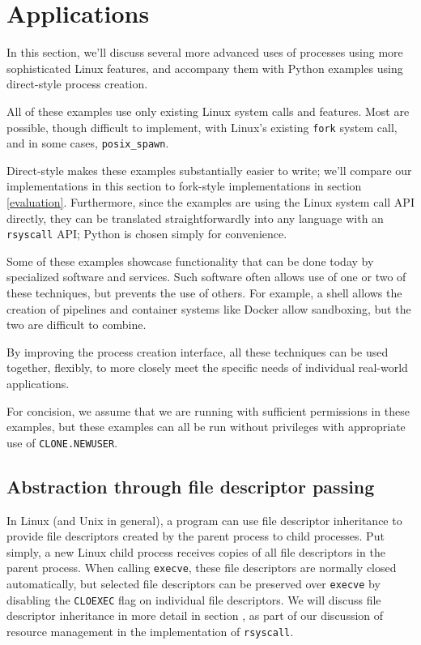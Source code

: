 \documentclass[sigplan]{acmart}
\begin{document}
\section{Applications}\label{applications}
In this section,
we'll discuss several more advanced uses of processes
using more sophisticated Linux features,
and accompany them with Python examples using direct-style process creation.

All of these examples use only existing Linux system calls and features.
Most are possible, though difficult to implement,
with Linux's existing \texttt{fork} system call,
and in some cases, \verb|posix_spawn|.

Direct-style makes these examples substantially easier to write;
we'll compare our implementations in this section to fork-style implementations in section \ref{evaluation}.
Furthermore, since the examples are using the Linux system call API directly,
they can be translated straightforwardly into any language with an \texttt{rsyscall} API;
Python is chosen simply for convenience.

Some of these examples showcase functionality that can be done today by specialized software and services.
Such software often allows use of one or two of these techniques, but prevents the use of others.
For example, a shell allows the creation of pipelines and container systems like Docker allow sandboxing,
but the two are difficult to combine.

By improving the process creation interface,
all these techniques can be used together, flexibly,
to more closely meet the specific needs of individual real-world applications.

For concision, we assume that we are running with sufficient permissions in these examples,
but these examples can all be run without privileges with appropriate use of \texttt{CLONE.NEWUSER}.
\subsection{Abstraction through file descriptor passing}\label{fd_abstraction}
In Linux (and Unix in general),
a program can use file descriptor inheritance
to provide file descriptors created by the parent process to child processes.
Put simply,
a new Linux child process receives copies of all file descriptors in the parent process.
When calling \texttt{execve}, these file descriptors are normally closed automatically,
but selected file descriptors can be preserved over \texttt{execve}
by disabling the \texttt{CLOEXEC} flag on individual file descriptors.
We will discuss file descriptor inheritance in more detail in section \label{fdtables},
as part of our discussion of resource management in the implementation of \texttt{rsyscall}.
\end{document}
